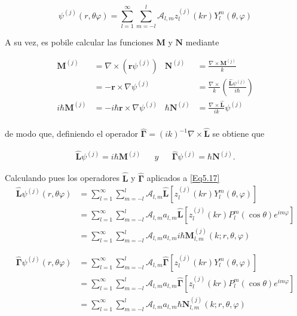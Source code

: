 \documentclass[a4paper,10pt]{article}
\newcommand{\hatbf}[1] {\hat{\mathbf{#1}}}	%
\newcommand{\Lop}{\hat{\mathbf{L}}}
\newcommand{\Gop}{\hat{\mathbf{\Gamma}}}
\begin{document}
\begin{equation}
\psi^{(j)}(r,\theta\varphi)=\sum_{l=1}^{\infty}\sum_{m=-l}^l \mathcal{A}_{l,m} z_l^{(j)}(kr)Y_l^m(\theta,\varphi)
\label{Eq5.17}
\end{equation}

A su vez, es pobile calcular las funciones $\textbf{M}$ y $\textbf{N}$ mediante

\begin{align}
\textbf{M}^{(j)}	&=\nabla\times(\textbf{r}\psi^{(j)})		&	\textbf{N}^{(j)}	&=\frac{\nabla\times\textbf{M}^{(j)}}{k}	\\
						&=-\textbf{r}\times\nabla\psi^{(j)}		&							&=\frac{\nabla\times}{k}\left(\frac{\hatbf{L}\psi^{(j)}}{i\hbar}\right)	\\
i\hbar\textbf{M}^{(j)}&=-i\hbar\textbf{r}\times\nabla\psi^{(j)}	&	\hbar\textbf{N}^{(j)}&=\frac{\nabla\times\hatbf{L}}{ik}\psi^{(j)}	\\
\end{align}

de modo que, definiendo el operador $\hat{\mathbf{\Gamma}}=(ik)^{-1}\nabla\times\hatbf{L}$ se obtiene que

\begin{align}
\hatbf{L}\psi^{(j)}=i\hbar\textbf{M}^{(j)}	&& y &&	\hat{\mathbf{\Gamma}}\psi^{(j)}=\hbar\textbf{N}^{(j)}.
\label{Eq5.22}
\end{align}

Calculando pues los operadores $\hatbf{L}$ y $\hatbf{\Gamma}$ aplicados a \eqref{Eq5.17}
\begin{equation}
\begin{aligned}
\Lop\psi^{(j)}(r,\theta\varphi)&=\sum_{l=1}^{\infty}\sum_{m=-l}^l \mathcal{A}_{l,m} \Lop[z_l^{(j)}(kr)Y_l^m(\theta,\varphi)]		\\
&=\sum_{l=1}^{\infty}\sum_{m=-l}^l \mathcal{A}_{l,m} a_{l,m}\Lop[z_l^{(j)}(kr)P_l^m(\cos\theta)e^{im\varphi}]	\\ 
&=\sum_{l=1}^{\infty}\sum_{m=-l}^l \mathcal{A}_{l,m} a_{l,m}i\hbar\textbf{M}_{l,m}^{(j)}(k;r,\theta,\varphi)
\end{aligned}
\end{equation}

\begin{equation}
\begin{aligned}
\Gop\psi^{(j)}(r,\theta\varphi)&=\sum_{l=1}^{\infty}\sum_{m=-l}^l \mathcal{A}_{l,m} \Gop[z_l^{(j)}(kr)Y_l^m(\theta,\varphi)]	\\
&=\sum_{l=1}^{\infty}\sum_{m=-l}^l \mathcal{A}_{l,m}a_{l,m} \Gop[z_l^{(j)}(kr)P_l^m(\cos\theta)e^{im\varphi}]		\\
&=\sum_{l=1}^{\infty}\sum_{m=-l}^l \mathcal{A}_{l,m} a_{l,m}\hbar\textbf{N}_{l,m}^{(j)}(k;r,\theta,\varphi)
\end{aligned}
\end{equation}
\end{document}
